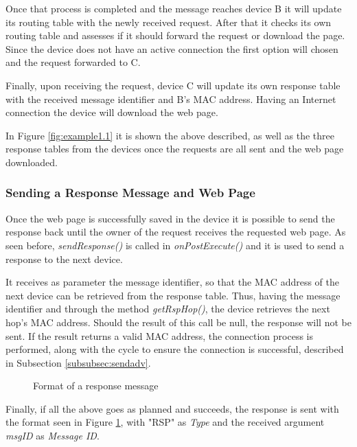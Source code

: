 Once that process is completed and the message reaches device B it will update its routing table with the newly received request. After that it checks its own routing table and assesses if it should forward the request or download the page. Since the device does not have an active connection the first option will chosen and the request forwarded to C.

Finally, upon receiving the request, device C will update its own response table with the received message identifier and B's \gls{MAC} address. Having an Internet connection the device will download the web page.

In Figure \ref{fig:example1.1} it is shown the above described, as well as the three response tables from the devices once the requests are all sent and the web page downloaded.

\subsubsection{Sending a Response Message and Web Page}
\label{subsubsec:sendrsp}

Once the web page is successfully saved in the device it is possible to send the response back until the owner of the request receives the requested web page. As seen before, \textit{sendResponse()} is called in \textit{onPostExecute()} and it is used to send a response to the next device.

It receives as parameter the message identifier, so that the \gls{MAC} address of the next device can be retrieved from the response table. Thus, having the message identifier and through the method \textit{getRspHop()}, the device retrieves the next hop's \gls{MAC} address. Should the result of this call be null, the response will not be sent. If the result returns a valid \gls{MAC} address, the connection process is performed, along with the cycle to ensure the connection is successful, described in Subsection \ref{subsubsec:sendadv}.

\begin{figure}[ht]
   \noindent{}
	\caption{\label{fig:rspmsg} Format of a response message}
\end{figure}

Finally, if all the above goes as planned and succeeds, the response is sent with the format seen in Figure \ref{fig:rspmsg}, with "RSP" as \textit{Type} and the received argument \textit{msgID} as \textit{Message ID}.

